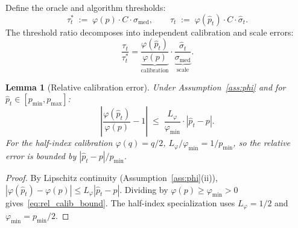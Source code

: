 \documentclass[11pt]{article}
\newtheorem{lemma}[theorem]{Lemma}
\theoremstyle{definition}
\newcommand{\abs}[1]{\left| #1 \right|}
\newcommand{\phat}{\hat{p}}
\newcommand{\shat}{\hat{\sigma}}
\begin{document}
Define the oracle and algorithm thresholds:
\begin{equation}\label{eq:tau_def}
  \tau_t^{*} \;:=\; \varphi(p)\cdot C\cdot \sigma_{\mathrm{med}},
  \qquad
  \tau_t \;:=\; \varphi(\phat_t)\cdot C\cdot \shat_t.
\end{equation}
The threshold ratio decomposes into independent calibration and scale errors:
\[
  \frac{\tau_t}{\tau_t^{*}}
  = \underbrace{\frac{\varphi(\phat_t)}{\varphi(p)}}_{\text{calibration}}
    \cdot \underbrace{\frac{\shat_t}{\sigma_{\mathrm{med}}}}_{\text{scale}}.
\]

\begin{lemma}[Relative calibration error]\label{lem:phi_rel}
Under Assumption~\ref{ass:phi} and for $\phat_t \in [p_{\min}, p_{\max}]$:
\begin{equation}\label{eq:rel_calib_bound}
  \abs{\frac{\varphi(\phat_t)}{\varphi(p)} - 1}
  \;\leq\; \frac{L_\varphi}{\varphi_{\min}} \cdot \abs{\phat_t - p}.
\end{equation}
For the half-index calibration $\varphi(q) = q/2$,
$L_\varphi/\varphi_{\min} = 1/p_{\min}$, so the relative error is bounded by
$\abs{\phat_t - p}/p_{\min}$.
\end{lemma}

\begin{proof}
By Lipschitz continuity (Assumption~\ref{ass:phi}(ii)),
$\abs{\varphi(\phat_t) - \varphi(p)} \leq L_\varphi\abs{\phat_t - p}$.
Dividing by $\varphi(p) \geq \varphi_{\min} > 0$ gives~\eqref{eq:rel_calib_bound}.
The half-index specialization uses $L_\varphi = 1/2$ and
$\varphi_{\min} = p_{\min}/2$.
\end{proof}
\end{document}
